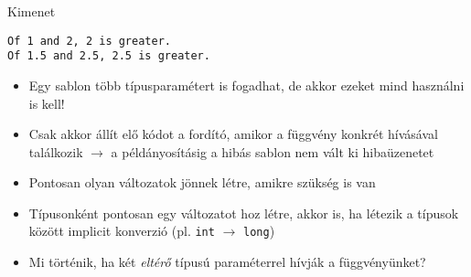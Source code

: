 \documentclass[usenames,dvipsnames,aspectratio=169]{beamer}
\begin{document}
\begin{frame}[fragile]
    \begin{exampleblock}{}
        \vspace{-.2cm}
        \scriptsize
        
        \vspace{-.2cm}
    \end{exampleblock}
    \begin{block}{Kimenet}
        \vspace{-.4cm}
        \scriptsize
        \begin{verbatim}
Of 1 and 2, 2 is greater.
Of 1.5 and 2.5, 2.5 is greater.
\end{verbatim}             
        \vspace{-.4cm}
    \end{block}
\end{frame}

\begin{frame}
    \begin{exampleblock}{}
        \scriptsize
        
    \end{exampleblock}
\end{frame}

\begin{frame}
    \begin{itemize}
        \item Egy sablon több típusparamétert is fogadhat, de akkor ezeket mind használni is kell!
        \item Csak akkor állít elő kódot a fordító, amikor a függvény konkrét hívásával találkozik $\to$ a példányosításig a hibás sablon nem vált ki hibaüzenetet
        \item Pontosan olyan változatok jönnek létre, amikre szükség is van
        \item Típusonként pontosan egy változatot hoz létre, akkor is, ha létezik a típusok között implicit konverzió (pl. \texttt{int} $\to$ \texttt{long})
        \item Mi történik, ha két \emph{eltérő} típusú paraméterrel hívják a függvényünket?
    \end{itemize}
\end{frame}

\begin{frame}
    \begin{exampleblock}{}
        \scriptsize
        
    \end{exampleblock}
\end{frame}
\end{document}
